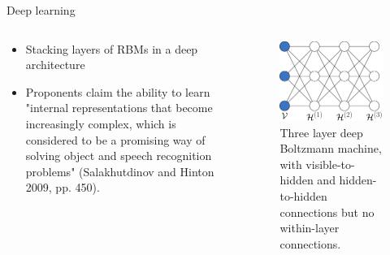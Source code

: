 \documentclass[ignorenonframetext,]{beamer}
\theoremstyle{definition}
\begin{document}
\begin{frame}{Deep learning}
\protect\hypertarget{deep-learning}{}

\begin{columns}[T] %
\begin{column}{.48\textwidth}
\begin{itemize}
\item Stacking layers of RBMs in a deep architecture
\item Proponents claim the ability to learn "internal representations that become increasingly complex, which is considered to be a promising way of solving object and speech recognition problems" (Salakhutdinov and Hinton 2009, pp. 450).
\end{itemize}
\end{column}
\hfill
\begin{column}{.48\textwidth}
\begin{figure}
\includegraphics[width=\linewidth]{../resources/images/deep_rbm.png}
\caption{Three layer deep Boltzmann machine, with visible-to-hidden and hidden-to-hidden connections but no within-layer connections.}
\end{figure}
\end{column}
\end{columns}

\end{frame}
\end{document}
